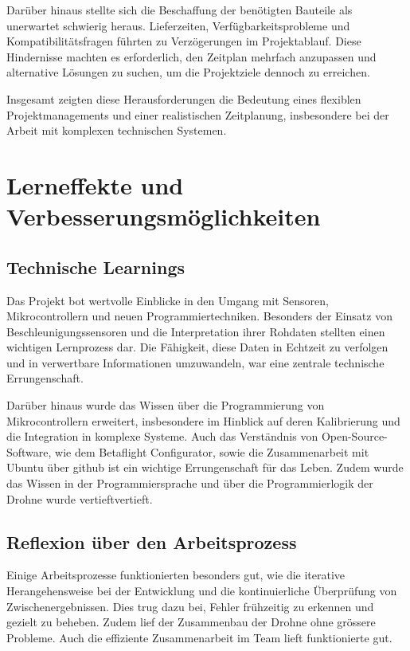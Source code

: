 Darüber hinaus stellte sich die Beschaffung der benötigten Bauteile als unerwartet schwierig heraus. Lieferzeiten, Verfügbarkeitsprobleme und Kompatibilitätsfragen führten zu Verzögerungen im Projektablauf. Diese Hindernisse machten es erforderlich, den Zeitplan mehrfach anzupassen und alternative Lösungen zu suchen, um die Projektziele dennoch zu erreichen.

Insgesamt zeigten diese Herausforderungen die Bedeutung eines flexiblen Projektmanagements und einer realistischen Zeitplanung, insbesondere bei der Arbeit mit komplexen technischen Systemen.

\section{Lerneffekte und Verbesserungsmöglichkeiten}

\subsection{Technische Learnings}

Das Projekt bot wertvolle Einblicke in den Umgang mit Sensoren, Mikrocontrollern und neuen Programmiertechniken. Besonders der Einsatz von Beschleunigungssensoren und die Interpretation ihrer Rohdaten stellten einen wichtigen Lernprozess dar. Die Fähigkeit, diese Daten in Echtzeit zu verfolgen und in verwertbare Informationen umzuwandeln, war eine zentrale technische Errungenschaft.

Darüber hinaus wurde das Wissen über die Programmierung von Mikrocontrollern erweitert, insbesondere im Hinblick auf deren Kalibrierung und die Integration in komplexe Systeme. Auch das Verständnis von Open-Source-Software, wie dem Betaflight Configurator, sowie die Zusammenarbeit mit Ubuntu über github ist ein wichtige Errungenschaft für das Leben. 
Zudem wurde das Wissen in der Programmiersprache und über die Programmierlogik der Drohne wurde vertieftvertieft. 

\subsection{Reflexion über den Arbeitsprozess}

Einige Arbeitsprozesse funktionierten besonders gut, wie die iterative Herangehensweise bei der Entwicklung und die kontinuierliche Überprüfung von Zwischenergebnissen. Dies trug dazu bei, Fehler frühzeitig zu erkennen und gezielt zu beheben. Zudem lief der Zusammenbau der Drohne ohne grössere Probleme.
Auch die effiziente Zusammenarbeit im Team lieft funktionierte gut.

